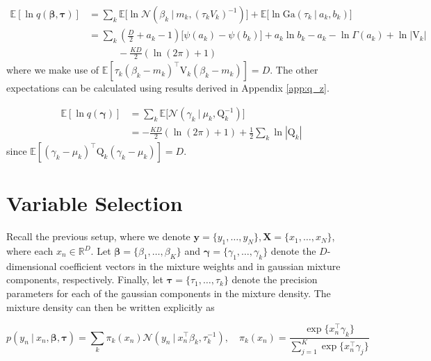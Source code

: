 \documentclass[twoside,11pt]{article}
\newcommand\given[1][]{\:#1\vert\:}
\newcommand{\transpose}[1]{#1^{\intercal}}
\newcommand{\R}{\mathbb{R}}
\newcommand{\ksum}{\sum\limits_{k}}
\newcommand{\boldbeta}{\boldsymbol\beta}
\newcommand{\boldgamma}{\boldsymbol\gamma}
\newcommand{\boldtau}{\boldsymbol\tau}
\newcommand{\E}{\mathbb{E}}
\newcommand{\pr}[1]{p \left( #1 \right)}
\begin{document}
\begin{equation} \label{eq:e6_deriv} %
\begin{split}
	\E[\ln q(\boldbeta, \boldtau)] &= \ksum \E \Big[ \ln \mathcal{N} \left( \beta_k \given m_k, (\tau_k V_k)^{-1}\right)\Big] + \E\Big[\ln \mathrm{Ga} \left( \tau_k \given a_k, b_k \right)\Big] \\
	&= \ksum \left( \frac{D}{2} + a_k - 1 \right) \big[\psi(a_k) - \psi(b_k) \big] + a_k \ln b_k - a_k - \ln \Gamma(a_k) + \ln |\mathrm{V}_{k}|\\
	& \quad \quad \quad -\frac{KD}{2} \left(  \ln(2\pi)  + 1\right)
\end{split}
\end{equation}
where we make use of $\E[\tau_k \transpose{(\beta_k - m_k)}\mathrm{V}_{k}(\beta_k - m_k)] = D$. The other expectations can be calculated using results derived in Appendix \ref{app:q_z}.

\begin{equation} \label{eq:e7_deriv}
\begin{split}
	\E[\ln q(\boldgamma)] &= \ksum \E \Big[ \mathcal{N} \left( \gamma_k \given \mu_k, \mathrm{Q}_{k}^{-1} \right)\Big] \\
	&= - \frac{KD}{2}(\ln (2\pi) + 1) + \frac{1}{2}\sum_{k} \ln|\mathrm{Q}_k| 
\end{split}
\end{equation}
since $\E[\transpose{(\gamma_k - \mu_k)}\mathrm{Q}_{k}(\gamma_k - \mu_k)] = D$.


\newpage

\section{Variable Selection} \label{app:vs}  %

Recall the previous setup, where we denote $\mathbf{y} = \{y_1, \ldots, y_N \}, \mathbf{X} = \{ x_1, \ldots, x_N \}$, where each $x_n \in \R^{D}$. Let $\boldbeta = \{ \beta_1, \ldots, \beta_K\}$ and $\boldgamma = \{ \gamma_1, \ldots, \gamma_k\}$ denote the $D$-dimensional coefficient vectors  in the mixture weights and in gaussian mixture components, respectively. Finally, let $\boldtau = \{ \tau_1, \ldots, \tau_k \}$ denote the precision parameters for each of the gaussian components in the mixture density. The mixture density can then be written explicitly as

\begin{equation} 
	 \pr{y_n \given x_n, \boldbeta, \boldtau} = \ksum \pi_k(x_n) \mathcal{N} \left( y_n \given \transpose{x_n}\beta_k, \tau_k^{-1} \right), \quad \pi_k(x_n) = \frac{\exp\{\transpose{x_n} \gamma_k\}}{\sum\limits_{j=1}^{K} \exp\{ \transpose{x_n} \gamma_j\}}
\end{equation}
\end{document}
